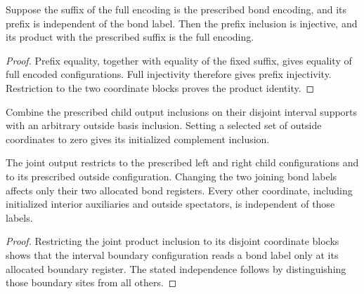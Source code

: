 \begin{lemma}
    \label{thm:mpu_prefix_basis_encoding}
    \leanok
    Suppose the suffix of the full encoding is the prescribed bond
    encoding, and its prefix is independent of the bond label.
    Then the prefix inclusion is injective, and its product with the
    prescribed suffix is the full encoding.
\end{lemma}
\begin{proof}\leanok
    Prefix equality, together with equality of the fixed suffix,
    gives equality of full encoded configurations. Full injectivity
    therefore gives prefix injectivity. Restriction to the two
    coordinate blocks proves the product identity.
\end{proof}

\begin{definition}
    \label{def:mpu_actual_joint_output_encoding}
    \leanok
    Combine the prescribed child output inclusions on their disjoint
    interval supports with an arbitrary outside basis inclusion.
    Setting a selected set of outside coordinates to zero gives
    its initialized complement inclusion.
\end{definition}

\begin{lemma}
    \label{thm:mpu_actual_joint_output_encoding}
    \leanok
    The joint output restricts to the prescribed left and right
    child configurations and to its prescribed outside configuration.
    Changing the two joining bond labels affects only their two
    allocated bond registers. Every other coordinate, including
    initialized interior auxiliaries and outside spectators, is
    independent of those labels.
\end{lemma}
\begin{proof}\leanok
    Restricting the joint product inclusion to its disjoint coordinate
    blocks shows that the interval boundary configuration reads a bond label
    only at its allocated boundary register. The stated independence
    follows by distinguishing those boundary sites from all others.
\end{proof}

